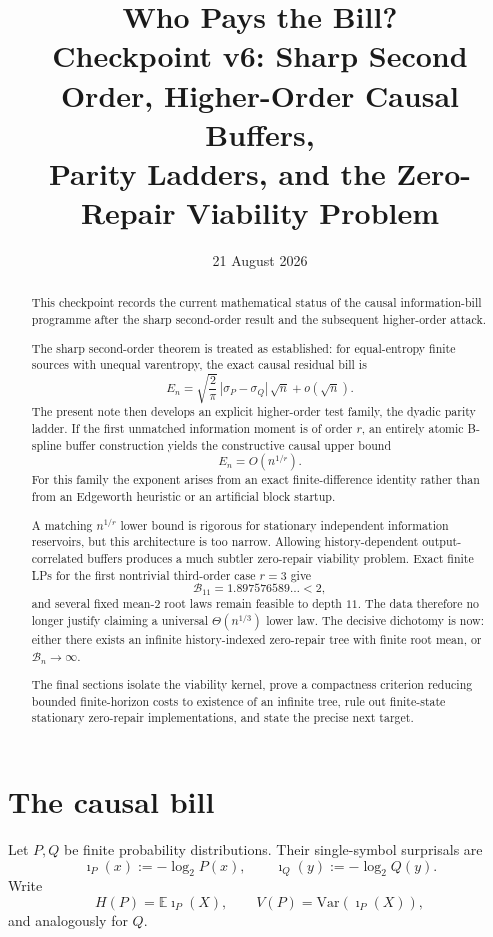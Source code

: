 \documentclass[11pt,a4paper]{article}
\title{\textbf{Who Pays the Bill?}\\[1mm]
\large Checkpoint v6: Sharp Second Order, Higher-Order Causal Buffers,\\
Parity Ladders, and the Zero-Repair Viability Problem}
\author{}
\date{21 August 2026}
\newcommand{\E}{\mathbb E}
\newcommand{\Var}{\mathrm{Var}}
\newcommand{\ip}{\imath}
\begin{document}
\maketitle

\begin{abstract}
This checkpoint records the current mathematical status of the causal
information-bill programme after the sharp second-order result and the
subsequent higher-order attack.

The sharp second-order theorem is treated as established: for equal-entropy
finite sources with unequal varentropy, the exact causal residual bill is
\[
E_n
=
\sqrt{\frac{2}{\pi}}\,
|\sigma_P-\sigma_Q|\,\sqrt n
+
o(\sqrt n).
\]
The present note then develops an explicit higher-order test family, the
dyadic parity ladder.  If the first unmatched information moment is of
order \(r\), an entirely atomic B-spline buffer construction yields the
constructive causal upper bound
\[
E_n=O(n^{1/r}).
\]
For this family the exponent arises from an exact finite-difference
identity rather than from an Edgeworth heuristic or an artificial block
startup.

A matching \(n^{1/r}\) lower bound is rigorous for stationary independent
information reservoirs, but this architecture is too narrow.  Allowing
history-dependent output-correlated buffers produces a much subtler
zero-repair viability problem.  Exact finite LPs for the first nontrivial
third-order case \(r=3\) give
\[
\mathcal B_{11}=1.897576589\ldots<2,
\]
and several fixed mean-\(2\) root laws remain feasible to depth \(11\).
The data therefore no longer justify claiming a universal
\(\Theta(n^{1/3})\) lower law.  The decisive dichotomy is now:
either there exists an infinite history-indexed zero-repair tree with finite
root mean, or \(\mathcal B_n\to\infty\).

The final sections isolate the viability kernel, prove a compactness
criterion reducing bounded finite-horizon costs to existence of an infinite
tree, rule out finite-state stationary zero-repair implementations, and
state the precise next target.
\end{abstract}

\tableofcontents

\section{The causal bill}

Let \(P,Q\) be finite probability distributions.  Their single-symbol
surprisals are
\[
\ip_P(x):=-\log_2 P(x),
\qquad
\ip_Q(y):=-\log_2 Q(y).
\]
Write
\[
H(P)=\E\ip_P(X),
\qquad
V(P)=\Var(\ip_P(X)),
\]
and analogously for \(Q\).
\end{document}
